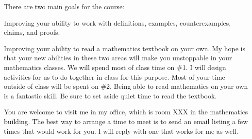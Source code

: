 \yourname


There are two main goals for the course:
\blist{0.1in}
\item Improving your ability to work with definitions, examples, counterexamples, claims, and proofs.
\item Improving your ability to read a mathematics textbook on your own.
\elist
My hope is that your new abilities in these two areas will make you unstoppable in your mathematics classes.
We will spend most of class time on \#1.  
I will design activities for us to do together in class for this purpose.
Most of your time outside of class will be spent on \#2.
Being able to read mathematics on your own is a fantastic skill.
Be sure to set aside quiet time to read the textbook.


\vspace*{1in}


\vspace*{1in}



\vspace*{0.5in}


\vspace*{0.5in}

You are welcome to visit me in my office, which is room XXX in the mathematics building.
The best way to arrange a time to meet is to send an email listing a few times that would work for you.
I will reply with one that works for me as well.


\vspace*{0.5in}

